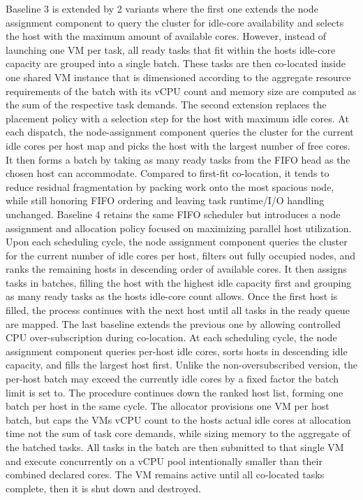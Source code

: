 Baseline 3 is extended by 2 variants where the first one extends the node assignment component to query the cluster for idle-core availability and selects the host with the maximum amount of available cores. However, instead of launching one VM per task, all ready tasks that fit within the hosts idle-core capacity are grouped into a single batch. These tasks are then co-located inside one shared VM instance that is dimensioned according to the aggregate resource requirements of the batch with its vCPU count and memory size are computed as the sum of the respective task demands.
The second extension replaces the placement policy with a selection step for the host with maximum idle cores. At each dispatch, the node-assignment component queries the cluster for the current idle cores per host map and picks the host with the largest number of free cores. It then forms a batch by taking as many ready tasks from the FIFO head as the chosen host can accommodate. Compared to first-fit co-location, it tends to reduce residual fragmentation by packing work onto the most spacious node, while still honoring FIFO ordering and leaving task runtime/I/O handling unchanged.
Baseline 4 retains the same FIFO scheduler but introduces a node assignment and allocation policy focused on maximizing parallel host utilization. Upon each scheduling cycle, the node assignment component queries the cluster for the current number of idle cores per host, filters out fully occupied nodes, and ranks the remaining hosts in descending order of available cores. It then assigns tasks in batches, filling the host with the highest idle capacity first and grouping as many ready tasks as the hosts idle-core count allows. Once the first host is filled, the process continues with the next host until all tasks in the ready queue are mapped.
The last baseline extends the previous one by allowing controlled CPU over-subscription during co-location.
At each scheduling cycle, the node assignment component queries per-host idle cores, sorts hosts in descending idle capacity, and fills the largest host first. Unlike the non-oversubscribed version, the per-host batch may exceed the currently idle cores by a fixed factor the batch limit is set to. The procedure continues down the ranked host list, forming one batch per host in the same cycle.
The allocator provisions one VM per host batch, but caps the VMs vCPU count to the hosts actual idle cores at allocation time not the sum of task core demands, while sizing memory to the aggregate of the batched tasks. All tasks in the batch are then submitted to that single VM and execute concurrently on a vCPU pool intentionally smaller than their combined declared cores. The VM remains active until all co-located tasks complete, then it is shut down and destroyed.

